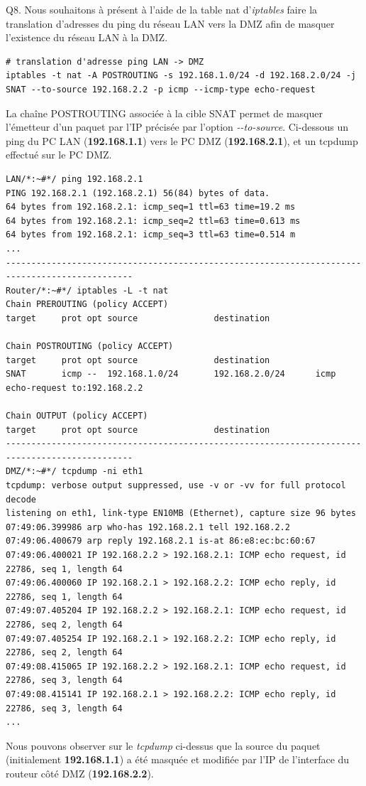 \documentclass[frenchb, 11pt]{article}
\newlength{\leftbarwidth}
\newlength{\leftbarsep}
\newcommand*{\leftbarcolorcmd}{\color{leftbarcolor}} %
\renewenvironment{leftbar}{%
    \def\FrameCommand{{\leftbarcolorcmd{\vrule width \leftbarwidth\relax\hspace {\leftbarsep}}}}%
    \MakeFramed {\advance \hsize -\width \FrameRestore }%
}{%
    \endMakeFramed
}
\begin{document}
\begin{leftbar}
	\noindent Q8. Nous souhaitons à présent à l'aide de la table nat d'\emph{iptables} faire la translation d'adresses du ping du réseau LAN vers la DMZ afin de masquer l'existence du réseau LAN à la DMZ.
	\begin{lstlisting}[numbers=none]
# translation d'adresse ping LAN -> DMZ
iptables -t nat -A POSTROUTING -s 192.168.1.0/24 -d 192.168.2.0/24 -j SNAT --to-source 192.168.2.2 -p icmp --icmp-type echo-request
	\end{lstlisting}
	La chaîne POSTROUTING associée à la cible SNAT permet de masquer l'émetteur d'un paquet par l'IP précisée par l'option \emph{-\--to-source}. Ci-dessous un ping du PC LAN (\textbf{192.168.1.1}) vers le PC DMZ (\textbf{192.168.2.1}), et un tcpdump effectué sur le PC DMZ.
	\begin{lstlisting}[numbers=none]
LAN/*:~#*/ ping 192.168.2.1
PING 192.168.2.1 (192.168.2.1) 56(84) bytes of data.
64 bytes from 192.168.2.1: icmp_seq=1 ttl=63 time=19.2 ms
64 bytes from 192.168.2.1: icmp_seq=2 ttl=63 time=0.613 ms
64 bytes from 192.168.2.1: icmp_seq=3 ttl=63 time=0.514 m
...
-----------------------------------------------------------------------------------------------
Router/*:~#*/ iptables -L -t nat
Chain PREROUTING (policy ACCEPT)
target     prot opt source               destination

Chain POSTROUTING (policy ACCEPT)
target     prot opt source               destination
SNAT       icmp --  192.168.1.0/24       192.168.2.0/24      icmp echo-request to:192.168.2.2

Chain OUTPUT (policy ACCEPT)
target     prot opt source               destination
-----------------------------------------------------------------------------------------------
DMZ/*:~#*/ tcpdump -ni eth1
tcpdump: verbose output suppressed, use -v or -vv for full protocol decode
listening on eth1, link-type EN10MB (Ethernet), capture size 96 bytes
07:49:06.399986 arp who-has 192.168.2.1 tell 192.168.2.2
07:49:06.400679 arp reply 192.168.2.1 is-at 86:e8:ec:bc:60:67
07:49:06.400021 IP 192.168.2.2 > 192.168.2.1: ICMP echo request, id 22786, seq 1, length 64
07:49:06.400060 IP 192.168.2.1 > 192.168.2.2: ICMP echo reply, id 22786, seq 1, length 64
07:49:07.405204 IP 192.168.2.2 > 192.168.2.1: ICMP echo request, id 22786, seq 2, length 64
07:49:07.405254 IP 192.168.2.1 > 192.168.2.2: ICMP echo reply, id 22786, seq 2, length 64
07:49:08.415065 IP 192.168.2.2 > 192.168.2.1: ICMP echo request, id 22786, seq 3, length 64
07:49:08.415141 IP 192.168.2.1 > 192.168.2.2: ICMP echo reply, id 22786, seq 3, length 64
...
	\end{lstlisting}
	Nous pouvons observer sur le \emph{tcpdump} ci-dessus que la source du paquet (initialement \textbf{192.168.1.1}) a été masquée et modifiée par l'IP de l'interface du routeur côté DMZ (\textbf{192.168.2.2}).
\end{leftbar}
\hfill
\end{document}
